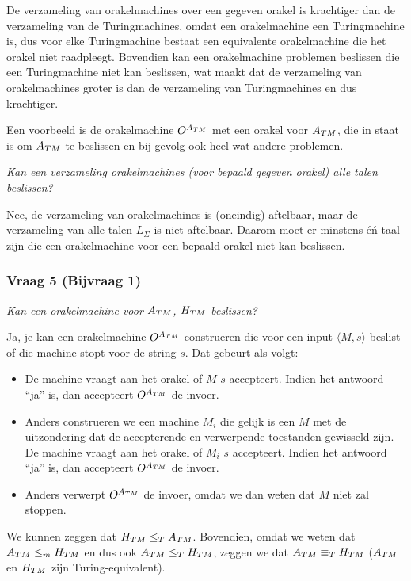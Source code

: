 De verzameling van orakelmachines over een gegeven orakel is krachtiger dan de verzameling van de Turingmachines, omdat een orakelmachine een Turingmachine is, dus voor elke Turingmachine bestaat een equivalente orakelmachine die het orakel niet raadpleegt. Bovendien kan een orakelmachine problemen beslissen die een Turingmachine niet kan beslissen, wat maakt dat de verzameling van orakelmachines groter is dan de verzameling van Turingmachines en dus krachtiger.

Een voorbeeld is de orakelmachine ${O^{{A_{TM}}}}$ met een orakel voor ${A_{TM}}$, die in staat is om ${A_{TM}}$ te beslissen en bij gevolg ook heel wat andere problemen.

\textit{Kan een verzameling orakelmachines (voor bepaald gegeven orakel) alle talen beslissen?}

Nee, de verzameling van orakelmachines is (oneindig) aftelbaar, maar de verzameling van alle talen $L_\Sigma$ is niet-aftelbaar. Daarom moet er minstens \'e\'n taal zijn die een orakelmachine voor een bepaald orakel niet kan beslissen.

\subsubsection{Vraag 5 (Bijvraag 1)}

\textit{Kan een orakelmachine voor ${A_{TM}}$, ${H_{TM}}$ beslissen?}

Ja, je kan een orakelmachine ${O^{{A_{TM}}}}$ construeren die voor een input $\langle M,s \rangle$ beslist of die machine stopt voor de string $s$. Dat gebeurt als volgt:

\begin{itemize}
\item De machine vraagt aan het orakel of $M$ $s$ accepteert. Indien het antwoord ``ja'' is, dan accepteert ${O^{{A_{TM}}}}$ de invoer.
\item Anders construeren we een machine $M_i$ die gelijk is een $M$ met de uitzondering dat de accepterende en verwerpende toestanden gewisseld zijn. De machine vraagt aan het orakel of $M_i$ $s$ accepteert. Indien het antwoord ``ja'' is, dan accepteert ${O^{{A_{TM}}}}$ de invoer.
\item Anders verwerpt ${O^{{A_{TM}}}}$ de invoer, omdat we dan weten dat $M$ niet zal stoppen.
\end{itemize}

We kunnen zeggen dat ${H_{TM}} \leq_T {A_{TM}}$. Bovendien, omdat we weten dat ${A_{TM}} \leq_m {H_{TM}}$ en dus ook ${A_{TM}} \leq_T {H_{TM}}$, zeggen we dat ${A_{TM}} \equiv_T {H_{TM}}$ (${A_{TM}}$ en ${H_{TM}}$ zijn Turing-equivalent).

